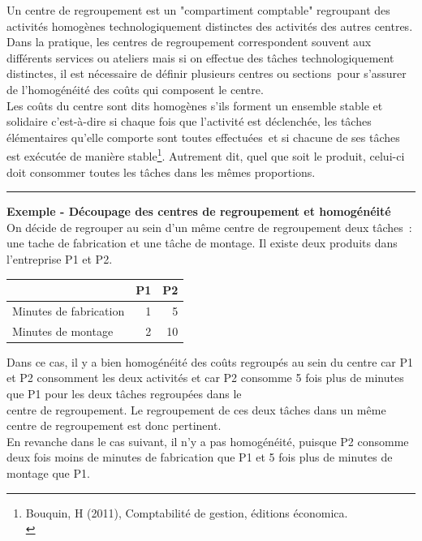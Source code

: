 \documentclass{tufte-handout}
\begin{document}
\begin{enumerate}
Un centre de regroupement est un "compartiment comptable" regroupant des activités homogènes technologiquement distinctes des activités des autres centres. Dans la pratique, les centres de regroupement correspondent souvent aux différents services ou ateliers mais si on effectue des tâches technologiquement distinctes, il est nécessaire de définir plusieurs centres ou sections pour s'assurer de l'homogénéité des coûts qui composent le centre.\\

Les coûts du centre sont dits homogènes s'ils forment un ensemble stable et solidaire c'est-à-dire si chaque fois que l'activité est déclenchée, les tâches élémentaires qu'elle comporte sont toutes effectuées et si chacune de ses tâches est exécutée de manière stable\footnote{Bouquin, H (2011), Comptabilité de gestion, éditions économica.\\}. Autrement dit, quel que soit le produit, celui-ci doit consommer toutes les tâches dans les mêmes proportions.\\

\noindent\rule{\textwidth}{0.5pt}
\textbf{Exemple - Découpage des centres de regroupement et homogénéité}\\

On décide de regrouper au sein d'un même centre de regroupement deux tâches : une tache de fabrication et une tâche de montage. Il existe deux produits dans l'entreprise P1 et P2.\\

\begin{center}
\begin{tabular}{lrr}
 & P1 & P2\\
\hline
Minutes de fabrication & 1 & 5\\
Minutes de montage & 2 & 10\\
\end{tabular}
\end{center}

Dans ce cas, il y a bien homogénéité des coûts regroupés au sein du centre car P1 et P2 consomment les deux activités et car P2 consomme 5 fois plus de minutes que P1 pour les deux tâches regroupées dans le\\
centre de regroupement. Le regroupement de ces deux tâches dans un même centre de regroupement est donc pertinent.\\

En revanche dans le cas suivant, il n'y a pas homogénéité, puisque P2 consomme deux fois moins de minutes de fabrication que P1 et 5 fois plus de minutes de montage que P1.\\


\end{enumerate}
\end{document}
